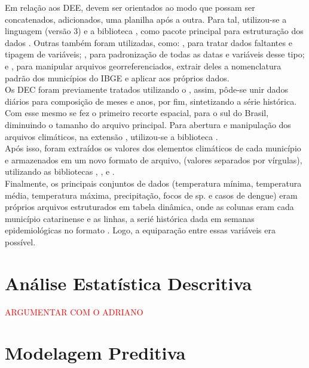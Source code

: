 Em relação aos \acrshort{DEE}, devem ser orientados ao modo que possam ser concatenados, adicionados, uma planilha após a outra. Para tal, utilizou-se a linguagem  (versão 3) \cite{python3_2009_van}  e a biblioteca  \cite{pandas_2010_scipy, pandas_2020_reback}, como pacote principal para estruturação dos dados . Outras também foram utilizadas, como:  \cite{numpy_2020_harrisarray}, para tratar dados faltantes e tipagem de variáveis;  \cite{python2_1995_van}, para padronização de todas as datas e variáveis desse tipo; e  \cite{geopandas_2020_kelseyjordahl}, para manipular arquivos georreferenciados, extrair deles a nomenclatura padrão dos municípios do \acrshort{IBGE} e aplicar aos próprios dados.\\
\indent Os \acrshort{DEC} foram previamente tratados utilizando o  \cite{CDO_2023_schulzweida}, assim, pôde-se unir dados diários para composição de meses e anos, por fim, sintetizando a série histórica. Com esse mesmo  se fez o primeiro recorte espacial, para o sul do Brasil, diminuindo o tamanho do arquivo principal. Para abertura e manipulação dos arquivos climáticos, na extensão , utilizou-se a biblioteca  \cite{xarray_2016_v0_8_0, xarray_2017_hoyer}.\\
\indent Após isso, foram extraídos os valores dos elementos climáticos de cada município e armazenados em um novo formato de arquivo,  (valores separados por vírgulas), utilizando as bibliotecas , ,  e  \cite{shapely_2007_gillies}.\\
\indent Finalmente,  os principais conjuntos de dados (temperatura mínima, temperatura média, temperatura máxima, precipitação, focos de  sp. e casos de dengue) eram próprios arquivos estruturados em tabela dinâmica, onde as colunas eram cada município catarinense e as linhas, a serié histórica dada em semanas epidemiológicas no formato . Logo, a equiparação entre essas variáveis era possível.


\section{Análise Estatística Descritiva}

\indent \textcolor{red}{ARGUMENTAR COM O ADRIANO}

\section{Modelagem Preditiva}

